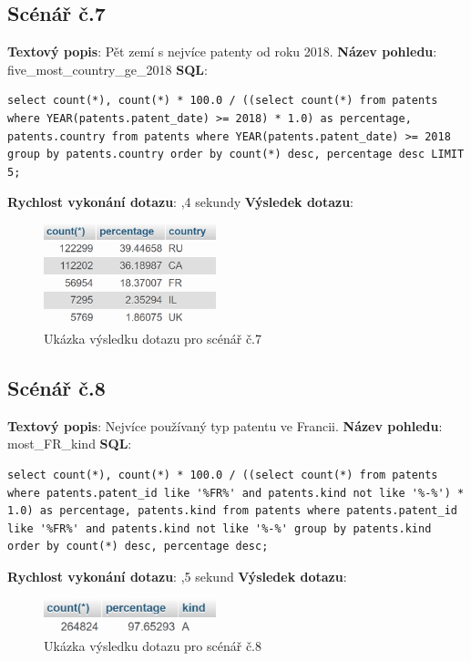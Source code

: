 \subsection{Scénář č.7}
\textbf{Textový popis}: Pět zemí s nejvíce patenty od roku 2018.
\newline
\textbf{Název pohledu}: five\_most\_country\_ge\_2018
\newline
\textbf{SQL}: 
\begin{lstlisting}[label = {lst:elements_a}]
select count(*), count(*) * 100.0 / ((select count(*) from patents where YEAR(patents.patent_date) >= 2018) * 1.0) as percentage, patents.country from patents where YEAR(patents.patent_date) >= 2018 group by patents.country order by count(*) desc, percentage desc LIMIT 5;
\end{lstlisting}
\textbf{Rychlost vykonání dotazu}: ,4 sekundy
\newline
\textbf{Výsledek dotazu}:
\begin{figure}[H]
\centering
\includegraphics[width=5cm]{img/scenare/scenar_7}
\caption{Ukázka výsledku dotazu pro scénář č.7}
\label{fig:scenar7}
\end{figure}

\subsection{Scénář č.8}
\textbf{Textový popis}: Nejvíce používaný typ patentu ve Francii.
\newline
\textbf{Název pohledu}: most\_FR\_kind
\newline
\textbf{SQL}: 
\begin{lstlisting}[label = {lst:elements_a}]
select count(*), count(*) * 100.0 / ((select count(*) from patents where patents.patent_id like '%FR%' and patents.kind not like '%-%') * 1.0) as percentage, patents.kind from patents where patents.patent_id like '%FR%' and patents.kind not like '%-%' group by patents.kind order by count(*) desc, percentage desc;
\end{lstlisting}
\textbf{Rychlost vykonání dotazu}: ,5 sekund
\newline
\textbf{Výsledek dotazu}:
\begin{figure}[H]
\centering
\includegraphics[width=5cm]{img/scenare/scenar_8}
\caption{Ukázka výsledku dotazu pro scénář č.8}
\label{fig:scenar8}
\end{figure}

